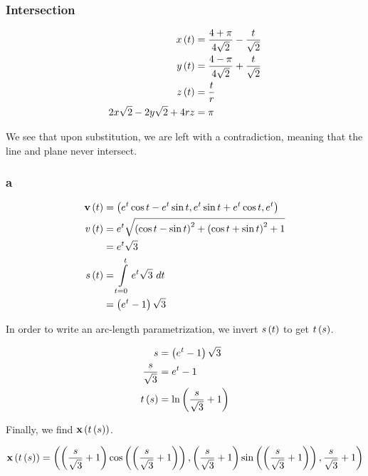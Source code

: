 \documentclass{article}
\begin{document}
\subsubsection*{Intersection}

\begin{align*}
  x \left ( t \right) &= \frac{4+\pi}{4 \sqrt{2}} - \frac{t}{\sqrt{2}} \\
  y \left ( t \right) &= \frac{4-\pi}{4 \sqrt{2}} + \frac{t}{\sqrt{2}} \\
  z \left ( t \right) &= \frac{t}{r} \\
  2 x\sqrt{2} - 2y\sqrt{2} + 4rz &= \pi \\
\end{align*}

We see that upon substitution, we are left with a contradiction, meaning that the line and plane never intersect.


\subsubsection*{a}

\begin{align*}
  \textbf{v} \left ( t \right) &= \left ( e^t \cos t - e^t \sin t, e^t \sin t + e^t \cos t, e^t \right) \\
  v \left ( t \right) &= e^t \sqrt{\left ( \cos t - \sin t \right)^2 + \left ( \cos t + \sin t \right)^2 + 1} \\
  &= e^t \sqrt{3} \\
  s \left ( t \right) &= \int \limits_{t=0}^{t} e^t \sqrt{3}\ dt \\
  &= \left ( e^t -1  \right) \sqrt{3} \\
\end{align*}

In order to write an arc-length parametrization, we invert $s \left ( t \right)$ to get $t \left ( s \right)$.

\begin{align*}
  s &= \left ( e^t - 1 \right) \sqrt{3} \\
  \frac{s}{\sqrt{3}} &= e^t - 1 \\
  t \left ( s \right) &= \ln \left ( \frac{s}{\sqrt{3}} + 1 \right) \\
\end{align*}

Finally, we find $\textbf{x} \left ( t \left ( s \right) \right)$.

\begin{align*}
  \textbf{x} \left ( t \left ( s \right) \right) &= \left ( \left ( \frac{s}{\sqrt{3}} + 1 \right) \cos \left ( \left ( \frac{s}{\sqrt{3}} + 1 \right) \right), \left ( \frac{s}{\sqrt{3}} + 1 \right) \sin \left ( \left ( \frac{s}{\sqrt{3}} + 1 \right) \right), \frac{s}{\sqrt{3}} + 1 \right) \\
\end{align*}
\end{document}
